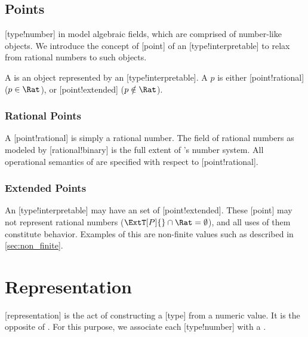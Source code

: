 \subsection{Points}

[type!number] in \basetwo model algebraic fields, which are comprised of number-like objects.
We introduce the concept of [point] of an [type!interpretable] to relax from rational numbers to such objects.

\begin{definition}[Point]
    A  is an object represented by an [type!interpretable].
    A  \(p\) is either [point!rational] (\(p \in \Rat\)), or [point!extended] (\(p \notin \Rat\)).
\end{definition}

\subsubsection{Rational Points}

A [point!rational] is simply a rational number.
The field of rational numbers \Rat{} as modeled by [rational!binary] is the full extent of \basetwo's number system.
All operational semantics of \basetwo are specified with respect to [point!rational].

\subsubsection{Extended Points}

An [type!interpretable] \Type[P] may have an \impldef set \ExtT[P]{} of [point!extended].
These [point] may not represent rational numbers (\(\ExtT[P]{} \cap \Rat = \emptyset\)), and all uses of them constitute \impldef behavior.
Examples of this are non-finite values such as described in \cref{sec:non_finite}.

\section{Representation}

[representation] is the act of constructing a [type]  from a numeric value.
It is the opposite of .
For this purpose, we associate each [type!number] with a .

